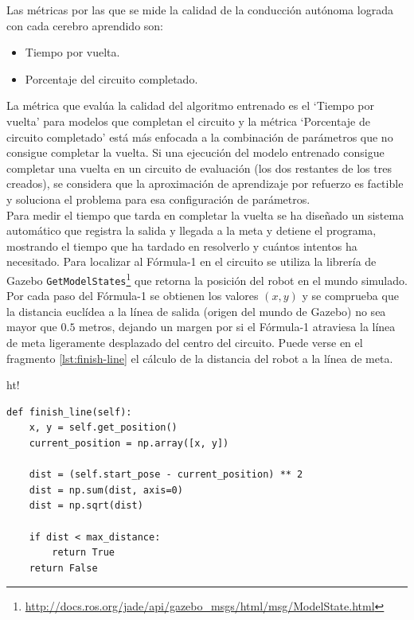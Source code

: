Las métricas por las que se mide la calidad de la conducción autónoma lograda con cada cerebro aprendido son:\\

\begin{itemize}
    \item Tiempo por vuelta.
    \item Porcentaje del circuito completado.\\
\end{itemize}

La métrica que evalúa la calidad del algoritmo entrenado es el `Tiempo por vuelta' para modelos que completan el circuito y la métrica `Porcentaje de circuito completado' está más enfocada a la combinación de parámetros que no consigue completar la vuelta. Si una ejecución del modelo entrenado consigue completar una vuelta en un circuito de evaluación (los dos restantes de los tres creados), se considera que la aproximación de aprendizaje por refuerzo es factible y soluciona el problema para esa configuración de parámetros. \\

Para medir el tiempo que tarda en completar la vuelta se ha diseñado un sistema automático que registra la salida y llegada a la meta y detiene el programa, mostrando el tiempo que ha tardado en resolverlo y cuántos intentos ha necesitado. Para localizar al Fórmula-1 en el circuito se utiliza la librería de Gazebo \texttt{GetModelStates}\footnote{\url{http://docs.ros.org/jade/api/gazebo_msgs/html/msg/ModelState.html}} que retorna la posición del robot en el mundo simulado. Por cada paso del Fórmula-1 se obtienen los valores $(x, y)$ y se comprueba que la distancia euclídea a la línea de salida (origen del mundo de Gazebo) no sea mayor que $0.5$ metros, dejando un margen por si el Fórmula-1 atraviesa la línea de meta ligeramente desplazado del centro del circuito. Puede verse en el fragmento \ref{lst:finish-line} el cálculo de la distancia del robot a la línea de meta.

\vspace{5mm}

\begin{tabular}{ht!}
\begin{lstlisting}[basicstyle=\ttfamily\scriptsize, caption={Cálculo de la distancia al origen del mundo de Gazebo.}, captionpos=b, numbers=none,label={lst:finish-line}, style=Python] 
def finish_line(self):
    x, y = self.get_position()
    current_position = np.array([x, y])

    dist = (self.start_pose - current_position) ** 2
    dist = np.sum(dist, axis=0)
    dist = np.sqrt(dist)
    
    if dist < max_distance:
        return True
    return False
\end{lstlisting}
\end{tabular}

